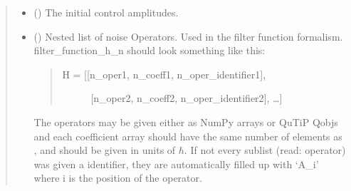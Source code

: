 \documentclass[letterpaper,10pt,english]{sphinxmanual}
\begin{document}
\begin{fulllineitems}
\begin{quote}
\begin{description}
\begin{itemize}
\item {} 
 (\sphinxstyleliteralemphasis{\sphinxupquote{, }}\sphinxstyleliteralemphasis{\sphinxupquote{ (}}\sphinxstyleliteralemphasis{\sphinxupquote{, }}\sphinxstyleliteralemphasis{\sphinxupquote{)}}\sphinxstyleliteralemphasis{\sphinxupquote{, }}) \textendash{} The initial control amplitudes.

\item {} 
 (\sphinxstyleliteralemphasis{\sphinxupquote{{[}}}\sphinxstyleliteralemphasis{\sphinxupquote{{[}}}\sphinxstyleliteralemphasis{\sphinxupquote{{]}}}\sphinxstyleliteralemphasis{\sphinxupquote{{]} or }}\sphinxstyleliteralemphasis{\sphinxupquote{{[}}}\sphinxstyleliteralemphasis{\sphinxupquote{{[}}}\sphinxstyleliteralemphasis{\sphinxupquote{{]}}}\sphinxstyleliteralemphasis{\sphinxupquote{{]}}}) \textendash{} 
Nested list of noise Operators. Used in the filter function
formalism. filter\_function\_h\_n should look something like this:
\begin{quote}
\begin{description}
\item[{H = {[}{[}n\_oper1, n\_coeff1, n\_oper\_identifier1{]},}] \leavevmode
{[}n\_oper2, n\_coeff2, n\_oper\_identifier2{]}, …{]}

\end{description}
\end{quote}

The operators may be given either as NumPy arrays or QuTiP Qobjs
and each coefficient array should have the same number of elements
as , and should be given in units of \(\hbar\). If not every
sublist (read: operator) was given a identifier, they are automatically
filled up with ‘A\_i’ where i is the position of the operator.



\end{itemize}
\end{description}
\end{quote}
\end{fulllineitems}
\end{document}
